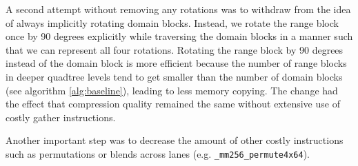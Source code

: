 A second attempt without removing any rotations was to withdraw from the idea of
always implicitly rotating domain blocks. Instead, we rotate the range block
once by 90 degrees explicitly while traversing the domain blocks in a manner
such that we can represent all four rotations. Rotating the range block by 90
degrees instead of the domain block is more efficient because the number of range
blocks in deeper quadtree levels tend to get smaller than the number of domain
blocks (see algorithm \ref{alg:baseline}), leading to less memory copying. The
change had the effect that compression quality remained the same without
extensive use of costly gather instructions.

Another important step was to decrease the amount of other costly instructions
such as permutations or blends across lanes (e.g. \verb|_mm256_permute4x64|).
